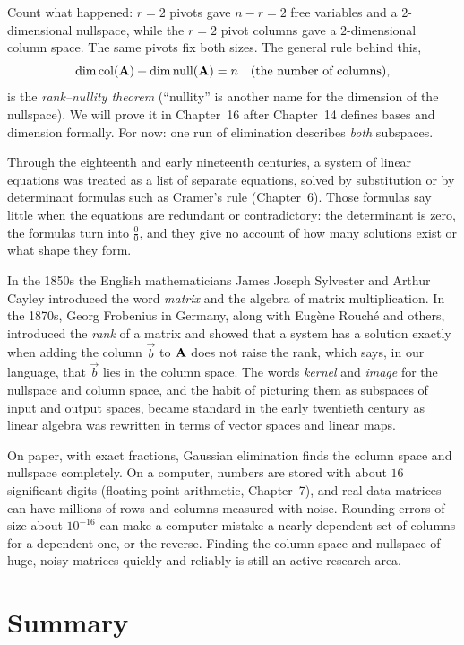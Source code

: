 Count what happened: $r = 2$ pivots gave $n - r = 2$ free variables and
a $2$-dimensional nullspace, while the $r = 2$ pivot columns gave a
$2$-dimensional column space. The same pivots fix both sizes. The general rule
behind this,
\[
  \dim\operatorname{col}(\mathbf{A}) + \dim\operatorname{null}(\mathbf{A}) = n \quad(\text{the number of columns}),
\]
is the \emph{rank--nullity theorem} (``nullity'' is another name for the
dimension of the nullspace). We will prove it in Chapter~16 after
Chapter~14 defines bases and dimension formally. For now: one run of
elimination describes \emph{both} subspaces.

\begin{historybox}
Through the eighteenth and early nineteenth centuries, a system of linear equations was treated as a list of separate equations, solved by substitution or by determinant formulas such as Cramer's rule (Chapter~6). Those formulas say little when the equations are redundant or contradictory: the determinant is zero, the formulas turn into $\frac{0}{0}$, and they give no account of how many solutions exist or what shape they form.

In the 1850s the English mathematicians James Joseph Sylvester and Arthur Cayley introduced the word \emph{matrix} and the algebra of matrix multiplication. In the 1870s, Georg Frobenius in Germany, along with Eugène Rouché and others, introduced the \emph{rank} of a matrix and showed that a system has a solution exactly when adding the column $\vec{b}$ to $\mathbf{A}$ does not raise the rank, which says, in our language, that $\vec{b}$ lies in the column space. The words \emph{kernel} and \emph{image} for the nullspace and column space, and the habit of picturing them as subspaces of input and output spaces, became standard in the early twentieth century as linear algebra was rewritten in terms of vector spaces and linear maps.

On paper, with exact fractions, Gaussian elimination finds the column space and nullspace completely. On a computer, numbers are stored with about $16$ significant digits (floating-point arithmetic, Chapter~7), and real data matrices can have millions of rows and columns measured with noise. Rounding errors of size about $10^{-16}$ can make a computer mistake a nearly dependent set of columns for a dependent one, or the reverse. Finding the column space and nullspace of huge, noisy matrices quickly and reliably is still an active research area.
\end{historybox}

\section{Summary}

